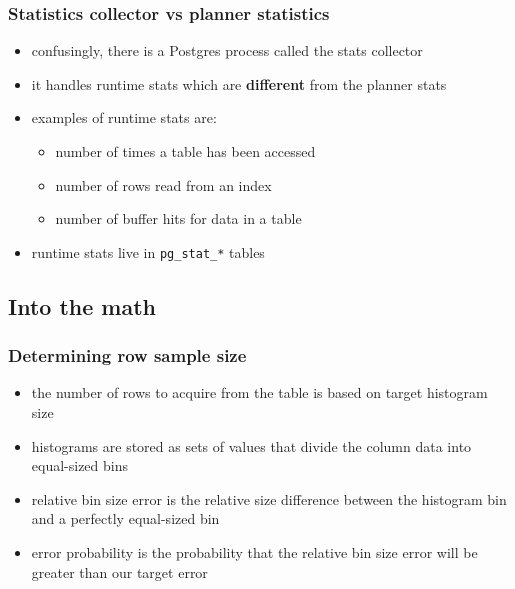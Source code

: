 \documentclass{beamer}
\begin{document}
\begin{frame}
  \frametitle{Statistics collector vs planner statistics}

  \begin{itemize}
  \item confusingly, there is a Postgres process called the \alert{stats
    collector}
  \item it handles \alert{runtime} stats which are \textbf{different} from the
    \alert{planner} stats
  \item examples of runtime stats are:
    \begin{itemize}
    \item number of times a table has been \alert{accessed}
    \item number of \alert{rows read} from an index
    \item number of \alert{buffer hits} for data in a table
    \end{itemize}
  \item runtime stats live in \texttt{pg\_stat\_*} tables
  \end{itemize}
\end{frame}

\subsection{Into the math}

\begin{frame}
  \frametitle{Determining row sample size}

  \begin{itemize}
  \item the number of rows to acquire from the table is based on \alert{target
    histogram size}
  \item histograms are stored as \alert{sets of values} that divide the column data
    into \alert{equal-sized bins}
  \item \alert{relative bin size error} is the relative size difference between
    the histogram bin and a perfectly equal-sized bin
  \item \alert{error probability} is the probability that the \alert{relative
    bin size error} will be \alert{greater than our target error}
  \end{itemize}
\end{frame}
\end{document}
